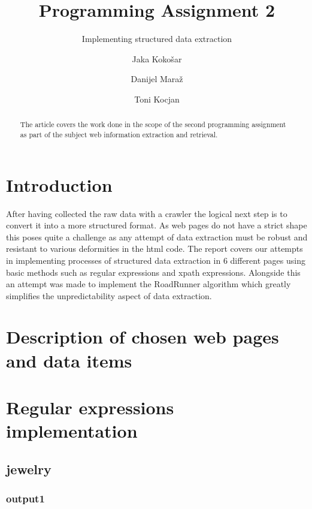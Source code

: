\documentclass[runningheads]{llncs}
\begin{document}
\title{Programming Assignment 2}
\subtitle{Implementing structured data extraction}

\author{
  Jaka Kokošar
  \and
  Danijel Maraž
  \and
  Toni Kocjan
}



\maketitle             

\begin{abstract}
The article covers the work done in the scope of the second programming assignment as part of the subject web information extraction and retrieval. 

\end{abstract}

\section{Introduction}
After having collected the raw data with a crawler the logical next step is to convert it into a more structured format. As web pages do not have a strict shape this poses quite a challenge as any attempt of data extraction must be robust and resistant to various deformities in the html code. The report covers our attempts in implementing processes of structured data extraction in 6 different pages using basic methods such as regular expressions and xpath expressions. Alongside this an attempt was made to implement the RoadRunner algorithm which greatly simplifies the unpredictability aspect of data extraction.
\section{Description of chosen web pages and data items}
\section{Regular expressions implementation}
\subsection{jewelry}
\subsubsection{output1}
\end{document}
